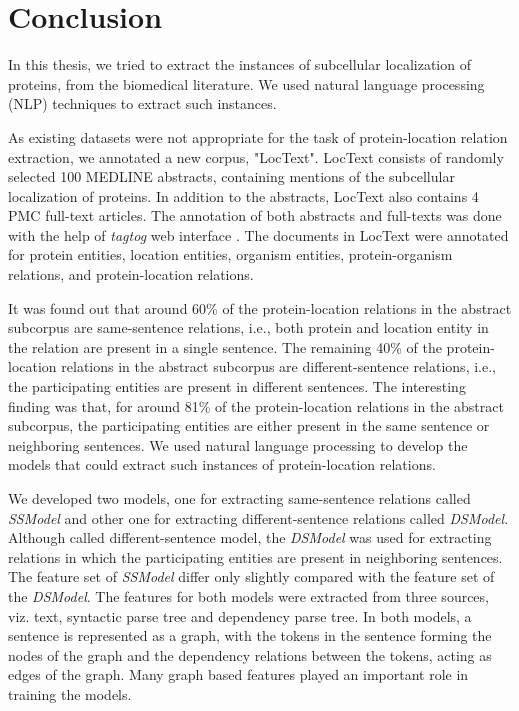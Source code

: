 \chapter{Conclusion}\label{chapter:conclusion}

In this thesis, we tried to extract the instances of subcellular localization of proteins, from the biomedical literature. We used natural language processing (NLP) techniques to extract such instances.

As existing datasets were not appropriate for the task of protein-location relation extraction, we annotated a new corpus, "LocText". LocText consists of randomly selected 100 MEDLINE \cite{medline} abstracts, containing mentions of the subcellular localization of proteins. In addition to the abstracts, LocText also contains 4 PMC \cite{pmc} full-text articles. The annotation of both abstracts and full-texts was done with the help of \textit{tagtog} web interface \cite{cejuela2014tagtog}.  The documents in LocText were annotated for protein entities, location entities, organism entities, protein-organism relations, and protein-location relations.

It was found out that around 60\% of the protein-location relations in the abstract subcorpus are same-sentence relations, i.e., both protein and location entity in the relation are present in a single sentence. The remaining 40\% of the protein-location relations in the abstract subcorpus are different-sentence relations, i.e., the participating entities are present in different sentences. The interesting finding was that, for around 81\% of the protein-location relations in the abstract subcorpus, the participating entities are either present in the same sentence or neighboring sentences. We used natural language processing to develop the models that could extract such instances of protein-location relations.

We developed two models, one for extracting same-sentence relations called \textit{SSModel} and other one for extracting different-sentence relations called \textit{DSModel}. Although called different-sentence model, the \textit{DSModel} was used for extracting relations in which the participating entities are present in neighboring sentences. The feature set of \textit{SSModel} differ only slightly compared with the feature set of the \textit{DSModel}. The features for both models were extracted from three sources, viz. text, syntactic parse tree and dependency parse tree. In both models, a sentence is represented as a graph, with the tokens in the sentence forming the nodes of the graph and the dependency relations between the tokens, acting as edges of the graph. Many graph based features played an important role in training the models.

